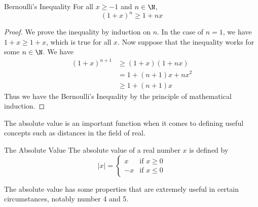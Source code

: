 \documentclass[a4paper]{article}
\begin{document}
\begin{thm}{Bernoulli's Inequality}{} For all $x\geq-1$ and $n\in\N$, $$(1+x)^n\geq1+nx$$\tcbline
\begin{proof} We prove the inequality by induction on $n$. In the case of $n=1$, we have $1+x\geq1+x$, which is true for all $x$. Now suppose that the inequality works for some $n\in\N$. We have 
\begin{align*}
(1+x)^{n+1}&\geq(1+x)(1+nx) \tag{Induction Hypothesis and $x\geq-1$} \\
&=1+(n+1)x+nx^2 \\
&\geq1+(n+1)x \tag{since $x^2\geq0$}
\end{align*}
Thus we have the Bernoulli's Inequality by the principle of mathematical induction. 
\end{proof}
\end{thm}

The absolute value is an important function when it comes to defining useful concepts such as distances in the field of real. 

\begin{defn}{The Absolute Value}{} The absolute value of a real number $x$ is defined by
$$|x|=\begin{cases}
x & \text{if $x\geq0$} \\
-x & \text{if $x\leq0$}
\end{cases}$$
\end{defn}

The absolute value has some properties that are extremely useful in certain circumstances, notably number 4 and 5. 
\end{document}
